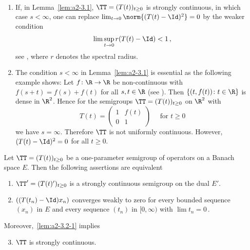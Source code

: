 \begin{remarks*}\label{rem:a2-3.1-kgk} ~ 
\begin{enumerate}[\upshape (i), wide, labelindent=0.5em]
\item \label{rem:a2-3.1-kgk-1}
If, in Lemma~\ref{lem:a2-3.1},    
$\TT = (T(t))_{t \geq 0}$ is strongly continuous, in which case 
$s < \infty$, one can replace 
$\lim_{t \to 0} \norm{(T(t) - \Id)^2} = 0$ by the weaker condition 
\[
\lim \sup_{t \to 0} r(T(t) - \Id) < 1\,, \]
see \textcite[Lemma 2]{lotz:1985}, where $r$ denotes the spectral radius.
\item \label{rem:a2-3.1-kgk-2}
The condition $s < \infty$ in Lemma~\ref{lem:a2-3.1}   
is essential as the following example shows:
Let $f \colon \R \to \R$ be non-continuous with $f(s+t) = f(s) + f(t)$ for all $s, t \in \R$ (see \textcite{hamel:1905}).
Then $\{(t,f(t)) \colon t \in \R\}$ is dense in $\R^2$.
Hence for the semigroups $\TT = (T(t))_{t \geq 0}$ on $\R^2$ with
\[
T(t) = \left( \begin{array}{cc}
    1 & f(t) \\
    0 & 1
\end{array} \right) \quad  \text{ for } t \geq 0
\]
we have $s = \infty$.
Therefore $\TT$ is not uniformly continuous.
However, $(T(t) - \Id)^{2} = 0$ for all $t \geq 0$.
\end{enumerate}
\end{remarks*}


\begin{lemma}\label{lem:a2-3.2}
Let $\TT = (T(t))_{t \geq 0}$ be a one-parameter semigroup of operators on a Banach space $E$.
Then the following assertions are equivalent
\begin{enumerate}[\upshape (a)]
\item \label{lem:a2-3.2-1}
$\TT' = (T(t)')_{t \geq 0}$ is a strongly continuous semigroup on the dual $E'$.
\item \label{lem:a2-3.2-2}
$((T(t_{n}) - \Id)x_n)$ converges weakly to zero for every bounded sequence $(x_n)$ in $E$ and every sequence $(t_n)$ in $[0,\infty)$ with $\lim t_n = 0$\,.
\end{enumerate}
Moreover,~\ref{lem:a2-3.2-1}   
implies
\begin{enumerate}[\upshape (a)]
\setcounter{enumi}{2}
\item \label{lem:a2-3.2-3}
$\TT$ is strongly continuous. 
\end{enumerate}
\end{lemma}

